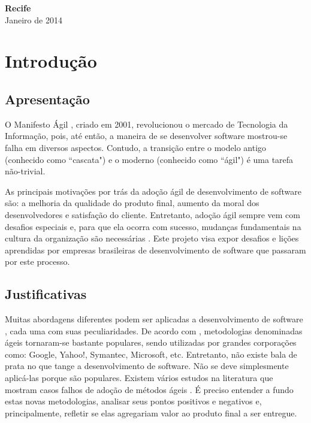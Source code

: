 \documentclass[a4paper,11pt]{article}
\begin{document}
\vspace{3.0cm}
\begin{center}
{\large {\bf Recife}\\[6mm]
Janeiro de 2014}
\end{center}
\newpage

\newpage
\pagestyle {plain}
\setcounter{page}{0} 

\section{Introdução}
\subsection{Apresentação}
O Manifesto Ágil \cite{agileManifesto}, criado em 2001, revolucionou o mercado de Tecnologia da Informação, pois, até então, a maneira de se desenvolver software mostrou-se falha em diversos aspectos. Contudo, a transição entre o modelo antigo (conhecido como ``cascata") e o moderno (conhecido como ``ágil") é uma tarefa não-trivial.

As principais motivações por trás da adoção ágil de desenvolvimento de software são: a melhoria da qualidade do produto final, aumento da moral dos desenvolvedores e satisfação do cliente. Entretanto, adoção ágil sempre vem com desafios especiais e, para que ela ocorra com sucesso, mudanças fundamentais na cultura da organização são necessárias \cite{Hassan2011}. Este projeto visa expor desafios e lições aprendidas por empresas brasileiras de desenvolvimento de software que passaram por este processo.
\subsection{Justificativas}
Muitas abordagens diferentes podem ser aplicadas a desenvolvimento de software \cite{Kettunen2010}, cada uma com suas peculiaridades. De acordo com \cite{Shore2007}, metodologias denominadas ágeis tornaram-se bastante populares, sendo utilizadas por grandes corporações como: Google, Yahoo!, Symantec, Microsoft, etc. Entretanto, não existe bala de prata no que tange a desenvolvimento de software. Não se deve simplesmente aplicá-las porque são populares. Existem vários estudos na literatura que mostram casos falhos de adoção de métodos ágeis \cite{Krasteva2008}. É preciso entender a fundo estas novas metodologias, analisar seus pontos positivos e negativos e, principalmente, refletir se elas agregariam valor ao produto final a ser entregue.
\end{document}
